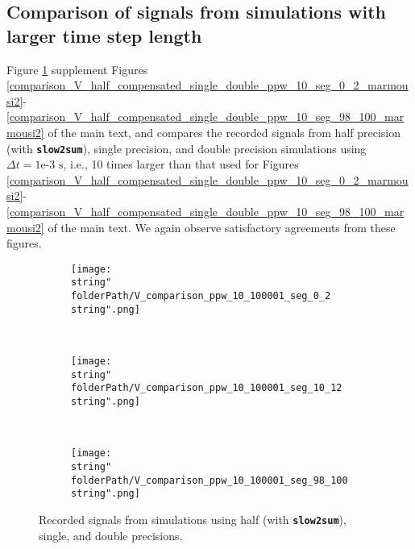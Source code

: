 \subsection{Comparison of signals from simulations with larger time step length}\label{SM_2D_signal_larger_dt}
%
Figure \ref{comparison_V_half_compensated_single_double_ppw_10_marmousi2_1e-3} 
supplement 
Figures \ref{comparison_V_half_compensated_single_double_ppw_10_seg_0_2_marmousi2}-\ref{comparison_V_half_compensated_single_double_ppw_10_seg_98_100_marmousi2}
of the main text, 
and compares the recorded signals from half precision (with \textbf{\texttt{\small slow2sum}}), single precision, and double precision simulations using $\Delta t = \text{1e-3 s}$, i.e., 10 times larger than that used for 
Figures \ref{comparison_V_half_compensated_single_double_ppw_10_seg_0_2_marmousi2}-\ref{comparison_V_half_compensated_single_double_ppw_10_seg_98_100_marmousi2} of the main text.%
%
\footnotemark
{}
%
We again observe satisfactory agreements from these figures.


\renewcommand{\folderPath}{\string"./fig/2D_example/marmousi2_101_401/nvidia_plot_dt_h_10_1p000404357910156e-03_6R_dt_s_10_1p000000047497451e-03_6R_dt_d_10_1p000000000000000e-03_6R/half_chop_D_chop_dx_chop_dt_single_double/\string"}
%
\begin{figure}[H]
\captionsetup{width=0.95\textwidth,font=footnotesize,labelfont=footnotesize}
\centering
%
\begin{subfigure}[b]{1\textwidth}
%
\centering\texttt{[image: \\string"\\folderPath/V\_comparison\_ppw\_10\_100001\_seg\_0\_2\\string".png]}
%
\end{subfigure}\hfill
\\[2ex]
%
\begin{subfigure}[b]{1\textwidth}
%
\centering\texttt{[image: \\string"\\folderPath/V\_comparison\_ppw\_10\_100001\_seg\_10\_12\\string".png]}
%
\end{subfigure}\hfill
\\[2ex]
%
\begin{subfigure}[b]{1\textwidth}
%
\centering\texttt{[image: \\string"\\folderPath/V\_comparison\_ppw\_10\_100001\_seg\_98\_100\\string".png]}
%
\end{subfigure}\hfill
%
\caption{Recorded signals from simulations using half (with \textbf{\texttt{\footnotesize slow2sum}}), single, and double precisions.}
\label{comparison_V_half_compensated_single_double_ppw_10_marmousi2_1e-3}
\end{figure}
%
\renewcommand{\folderPath}{\string"/dev/null\string"}


